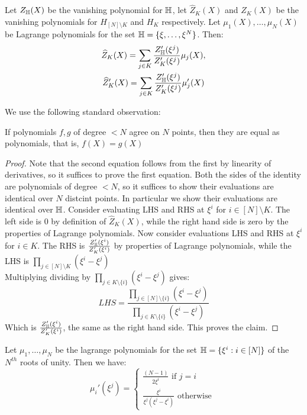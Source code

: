 \begin{lemma}\label{lem:zk-hat}
Let $Z_{\mathbb{H}}(X)$ be the vanishing polynomial for $\mathbb{H}$, let $\widehat{Z}_K(X)$ and  $Z_K(X)$ be the vanishing polynomials for $H_{[N]\setminus K}$ and $H_K$ respectively.
Let $\mu_1(X),\ldots,\mu_N(X)$ be Lagrange polynomials for the set $\mathbb{H}=\{\xi,\ldots,\xi^N\}$. Then:
\begin{gather}
    \widehat{Z}_K(X) = \sum_{j\in K}\frac{Z_{\mathbb{H}}'(\xi^j)}{Z_K'(\xi^j)}\mu_j(X), \\
    \widehat{Z}_K'(X)= \sum_{j\in K}\frac{Z_{\mathbb{H}}'(\xi^j)}{Z_K'(\xi^j)}\mu_j'(X)
\end{gather}
\end{lemma}
We use the following standard observation:
\begin{fact}
    If polynomials $f,g$ of degree $<N$ agree on $N$ points, then they are equal as polynomials, that is, $f(X)=g(X)$
\end{fact}

\begin{proof}
    Note that the second equation follows from the first by linearity of derivatives, so it suffices to prove the first equation.
    Both the sides of the identity are polynomials of degree $<N$, so it suffices to show their evaluations are identical over $N$ distcint points.
    In particular we show their evaluations are identical over $\mathbb{H}$.
    Consider evaluating LHS and RHS at $\xi^i$ for $i \in [N]\setminus K$.
    The left side is $0$ by definition of $\hat{Z}_K(X)$, while the right hand side is zero by the properties of Lagrange polynomials.
    Now consider evaluations LHS and RHS at $\xi^i$ for $i \in K$.
    The RHS is $\frac{Z_{\mathbb{H}}'(\xi^i)}{Z_K'(\xi^i)}$ by properties of Lagrange polynomials, while the
    LHS is $\prod_{j \in [N]\setminus K} (\xi^i-\xi^j)$\\
    Multiplying dividing by $\prod_{ j \in K \setminus \{i\}}(\xi^i-\xi^j)$ gives:
    $$LHS = \frac{\prod_{j \in [N] \setminus \{i\}} (\xi^i-\xi^j)}{\prod_{j \in K \setminus \{i\}}(\xi^i-\xi^j)}$$
    Which is $\frac{Z_{\mathbb{H}}'(\xi^i)}{Z_K'(\xi^i)}$, the same as the right hand side.
    This proves the claim.
\end{proof}

\begin{lemma}\label{lem:lamda-deriv}
Let $\mu_1,\ldots,\mu_N$ be the lagrange polynomials for the set $\mathbb{H}=\{\xi^i:i\in [N]\}$
of the $N^{th}$ roots of unity. Then we have:
\begin{equation*}
    \mu_i'(\xi^j) = \begin{cases}
                        \frac{(N-1)}{2\xi^{i}}  \text{ if } j=i\\
                        \frac{\xi^i}{\xi^j(\xi^j-\xi^i)} \text{ otherwise }
    \end{cases}
\end{equation*}
\end{lemma}

